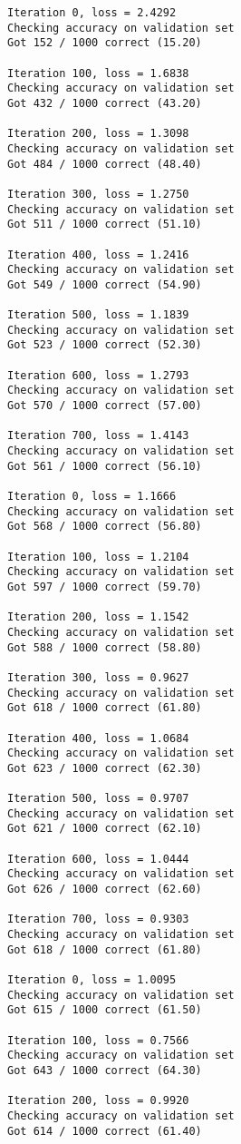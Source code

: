 \documentclass[11pt]{article}
\begin{document}
    \begin{Verbatim}[commandchars=\\\{\}]
Iteration 0, loss = 2.4292
Checking accuracy on validation set
Got 152 / 1000 correct (15.20)

Iteration 100, loss = 1.6838
Checking accuracy on validation set
Got 432 / 1000 correct (43.20)

Iteration 200, loss = 1.3098
Checking accuracy on validation set
Got 484 / 1000 correct (48.40)

Iteration 300, loss = 1.2750
Checking accuracy on validation set
Got 511 / 1000 correct (51.10)

Iteration 400, loss = 1.2416
Checking accuracy on validation set
Got 549 / 1000 correct (54.90)

Iteration 500, loss = 1.1839
Checking accuracy on validation set
Got 523 / 1000 correct (52.30)

Iteration 600, loss = 1.2793
Checking accuracy on validation set
Got 570 / 1000 correct (57.00)

Iteration 700, loss = 1.4143
Checking accuracy on validation set
Got 561 / 1000 correct (56.10)

Iteration 0, loss = 1.1666
Checking accuracy on validation set
Got 568 / 1000 correct (56.80)

Iteration 100, loss = 1.2104
Checking accuracy on validation set
Got 597 / 1000 correct (59.70)

Iteration 200, loss = 1.1542
Checking accuracy on validation set
Got 588 / 1000 correct (58.80)

Iteration 300, loss = 0.9627
Checking accuracy on validation set
Got 618 / 1000 correct (61.80)

Iteration 400, loss = 1.0684
Checking accuracy on validation set
Got 623 / 1000 correct (62.30)

Iteration 500, loss = 0.9707
Checking accuracy on validation set
Got 621 / 1000 correct (62.10)

Iteration 600, loss = 1.0444
Checking accuracy on validation set
Got 626 / 1000 correct (62.60)

Iteration 700, loss = 0.9303
Checking accuracy on validation set
Got 618 / 1000 correct (61.80)

Iteration 0, loss = 1.0095
Checking accuracy on validation set
Got 615 / 1000 correct (61.50)

Iteration 100, loss = 0.7566
Checking accuracy on validation set
Got 643 / 1000 correct (64.30)

Iteration 200, loss = 0.9920
Checking accuracy on validation set
Got 614 / 1000 correct (61.40)


\end{Verbatim}
\end{document}
